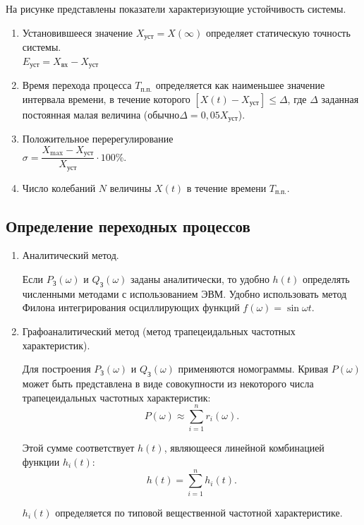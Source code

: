 \documentclass[unicode, 12pt, a4paper, oneside]{article}
\begin{document}
На рисунке представлены показатели характеризующие устойчивость системы.

\begin{enumerate}
\item Установившееся значение $ X_\text{уст} = X(\infty) $ определяет статическую точность системы.\\ $ E_\text{уст} = X_\text{вх} - X_\text{уст} $
\item Время перехода процесса $ T_\text{п.п.} $ определяется как наименьшее значение интервала времени, в течение которого $ [X(t)- X_\text{уст}] \leq \Delta $, где $ \Delta $ заданная постоянная малая величина (обычно$  \Delta = 0,05 X_\text{уст} $).
\item Положительное перерегулирование\\ $ \sigma = \dfrac{X_\text{max} - X_\text{уст}}{X_\text{уст}} \cdot 100\% $.
\item Число колебаний $ N $ величины $ X(t) $ в течение времени $ T_\text{п.п.} $.
\end{enumerate}

\subsection*{Определение переходных процессов}

\begin{enumerate}
\item Аналитический метод.

Если $ P_\text{З}(\omega) $ и $ Q_\text{З}(\omega) $ заданы аналитически, то удобно $ h(t) $ определять численными методами с использованием ЭВМ. Удобно использовать метод Филона интегрирования осциллирующих функций $ f(\omega) = \sin\omega t $.


\item Графоаналитический метод (метод трапецеидальных частотных характеристик).

Для построения $ P_\text{З}(\omega) $ и $ Q_\text{З}(\omega) $ применяются номограммы. Кривая $ P(\omega) $ может быть представлена в виде совокупности из некоторого числа трапецеидальных частотных характеристик:
\begin{equation}
P(\omega) \approx \sum_{i=1}^{n} r_i(\omega).
\end{equation}

Этой сумме соответствует $ h(t) $, являющееся линейной комбинацией функции $ h_i(t) $:
\begin{equation}
h(t) = \sum_{i=1}^{n} h_i(t).
\end{equation}

$ h_i(t) $ определяется по типовой вещественной частотной характеристике.
\end{enumerate}
\end{document}
